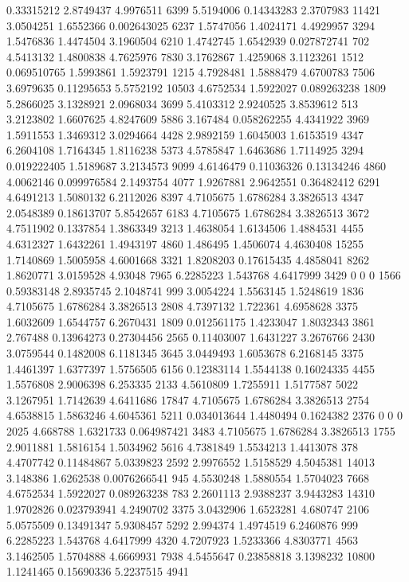 0.33315212 2.8749437 4.9976511 6399
5.5194006 0.14343283 2.3707983 11421
3.0504251 1.6552366 0.002643025 6237
1.5747056 1.4024171 4.4929957 3294
1.5476836 1.4474504 3.1960504 6210
1.4742745 1.6542939 0.027872741 702
4.5413132 1.4800838 4.7625976 7830
3.1762867 1.4259068 3.1123261 1512
0.069510765 1.5993861 1.5923791 1215
4.7928481 1.5888479 4.6700783 7506
3.6979635 0.11295653 5.5752192 10503
4.6752534 1.5922027 0.089263238 1809
5.2866025 3.1328921 2.0968034 3699
5.4103312 2.9240525 3.8539612 513
3.2123802 1.6607625 4.8247609 5886
3.167484 0.058262255 4.4341922 3969
1.5911553 1.3469312 3.0294664 4428
2.9892159 1.6045003 1.6153519 4347
6.2604108 1.7164345 1.8116238 5373
4.5785847 1.6463686 1.7114925 3294
0.019222405 1.5189687 3.2134573 9099
4.6146479 0.11036326 0.13134246 4860
4.0062146 0.099976584 2.1493754 4077
1.9267881 2.9642551 0.36482412 6291
4.6491213 1.5080132 6.2112026 8397
4.7105675 1.6786284 3.3826513 4347
2.0548389 0.18613707 5.8542657 6183
4.7105675 1.6786284 3.3826513 3672
4.7511902 0.1337854 1.3863349 3213
1.4638054 1.6134506 1.4884531 4455
4.6312327 1.6432261 1.4943197 4860
1.486495 1.4506074 4.4630408 15255
1.7140869 1.5005958 4.6001668 3321
1.8208203 0.17615435 4.4858041 8262
1.8620771 3.0159528 4.93048 7965
6.2285223 1.543768 4.6417999 3429
0 0 0 1566
0.59383148 2.8935745 2.1048741 999
3.0054224 1.5563145 1.5248619 1836
4.7105675 1.6786284 3.3826513 2808
4.7397132 1.722361 4.6958628 3375
1.6032609 1.6544757 6.2670431 1809
0.012561175 1.4233047 1.8032343 3861
2.767488 0.13964273 0.27304456 2565
0.11403007 1.6431227 3.2676766 2430
3.0759544 0.1482008 6.1181345 3645
3.0449493 1.6053678 6.2168145 3375
1.4461397 1.6377397 1.5756505 6156
0.12383114 1.5544138 0.16024335 4455
1.5576808 2.9006398 6.253335 2133
4.5610809 1.7255911 1.5177587 5022
3.1267951 1.7142639 4.6411686 17847
4.7105675 1.6786284 3.3826513 2754
4.6538815 1.5863246 4.6045361 5211
0.034013644 1.4480494 0.1624382 2376
0 0 0 2025
4.668788 1.6321733 0.064987421 3483
4.7105675 1.6786284 3.3826513 1755
2.9011881 1.5816154 1.5034962 5616
4.7381849 1.5534213 1.4413078 378
4.4707742 0.11484867 5.0339823 2592
2.9976552 1.5158529 4.5045381 14013
3.148386 1.6262538 0.0076266541 945
4.5530248 1.5880554 1.5704023 7668
4.6752534 1.5922027 0.089263238 783
2.2601113 2.9388237 3.9443283 14310
1.9702826 0.023793941 4.2490702 3375
3.0432906 1.6523281 4.680747 2106
5.0575509 0.13491347 5.9308457 5292
2.994374 1.4974519 6.2460876 999
6.2285223 1.543768 4.6417999 4320
4.7207923 1.5233366 4.8303771 4563
3.1462505 1.5704888 4.6669931 7938
4.5455647 0.23858818 3.1398232 10800
1.1241465 0.15690336 5.2237515 4941
